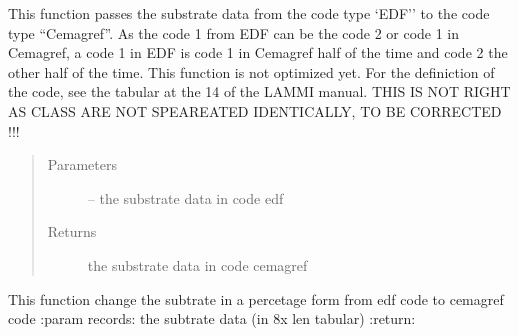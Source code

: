 \documentclass[letterpaper,10pt,english]{sphinxmanual}
\begin{document}

\begin{fulllineitems}
\label{\detokenize{index:src.substrate.edf_to_cemagref}}
This function passes the substrate data from the code type `EDF'' to the code type ``Cemagref''. As the code 1 from EDF
can be the code 2 or code 1 in Cemagref, a code 1 in EDF is code 1 in Cemagref half of the time and code 2 the
other half of the time. This function is not optimized yet. For the definiction of the code, see the tabular at the 14
of the LAMMI manual. THIS IS NOT RIGHT AS CLASS ARE NOT SPEAREATED IDENTICALLY,  TO BE CORRECTED !!!
\begin{quote}\begin{description}
\item[{Parameters}] \leavevmode
{} -- the substrate data in code edf

\item[{Returns}] \leavevmode
the substrate data in code cemagref

\end{description}\end{quote}

\end{fulllineitems}


\begin{fulllineitems}
\label{\detokenize{index:src.substrate.edf_to_cemagref_by_percentage}}
This function change the subtrate in a percetage form from edf code to cemagref code
:param records: the subtrate data (in 8x len tabular)
:return:

\end{fulllineitems}

\end{document}
